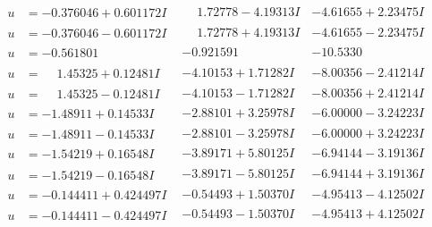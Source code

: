 \documentclass[1p]{elsarticle_modified}
\theoremstyle{definition}
\begin{document}
$$\begin{array}{c|c|c}
\begin{aligned}
u &= -0.376046 + 0.601172 I\end{aligned}
 & \phantom{-}1.72778 - 4.19313 I & -4.61655 + 2.23475 I \\ \hline\begin{aligned}
u &= -0.376046 - 0.601172 I\end{aligned}
 & \phantom{-}1.72778 + 4.19313 I & -4.61655 - 2.23475 I \\ \hline\begin{aligned}
u &= -0.561801\phantom{ +0.000000I}\end{aligned}
 & -0.921591\phantom{ +0.000000I} & -10.5330\phantom{ +0.000000I} \\ \hline\begin{aligned}
u &= \phantom{-}1.45325 + 0.12481 I\end{aligned}
 & -4.10153 + 1.71282 I & -8.00356 - 2.41214 I \\ \hline\begin{aligned}
u &= \phantom{-}1.45325 - 0.12481 I\end{aligned}
 & -4.10153 - 1.71282 I & -8.00356 + 2.41214 I \\ \hline\begin{aligned}
u &= -1.48911 + 0.14533 I\end{aligned}
 & -2.88101 + 3.25978 I & -6.00000 - 3.24223 I \\ \hline\begin{aligned}
u &= -1.48911 - 0.14533 I\end{aligned}
 & -2.88101 - 3.25978 I & -6.00000 + 3.24223 I \\ \hline\begin{aligned}
u &= -1.54219 + 0.16548 I\end{aligned}
 & -3.89171 + 5.80125 I & -6.94144 - 3.19136 I \\ \hline\begin{aligned}
u &= -1.54219 - 0.16548 I\end{aligned}
 & -3.89171 - 5.80125 I & -6.94144 + 3.19136 I \\ \hline\begin{aligned}
u &= -0.144411 + 0.424497 I\end{aligned}
 & -0.54493 + 1.50370 I & -4.95413 - 4.12502 I \\ \hline\begin{aligned}
u &= -0.144411 - 0.424497 I\end{aligned}
 & -0.54493 - 1.50370 I & -4.95413 + 4.12502 I \\ \hline\begin{aligned}

\end{aligned}
\end{array}$$
\end{document}
